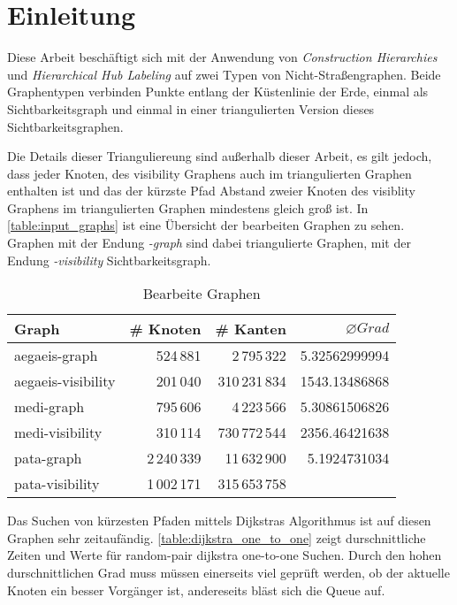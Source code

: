 \chapter{Einleitung}

Diese Arbeit beschäftigt sich mit der Anwendung von \emph{Construction Hierarchies} und \emph{Hierarchical Hub Labeling} auf zwei Typen von Nicht-Straßengraphen.
Beide Graphentypen verbinden Punkte entlang der Küstenlinie der Erde, einmal als Sichtbarkeitsgraph und einmal in einer triangulierten Version dieses Sichtbarkeitsgraphen.


Die Details dieser Trianguliereung sind außerhalb dieser Arbeit, es gilt jedoch, dass jeder Knoten, des visibility Graphens auch im triangulierten Graphen enthalten ist und das der kürzste Pfad Abstand zweier Knoten des visiblity Graphens im triangulierten Graphen mindestens gleich groß ist.
In \autoref{table:input_graphs} ist eine Übersicht der bearbeiten Graphen zu sehen. Graphen mit der Endung \emph{-graph} sind dabei triangulierte Graphen, mit der Endung \emph{-visibility} Sichtbarkeitsgraph.

\begin{table}[h]
    \centering
    \begin{tabular}{lrrr}
        \toprule
        Graph              & \# Knoten   & \# Kanten     & $\varnothing Grad$ \\ \midrule
        aegaeis-graph      & 524\,881    & 2\,795\,322   & 5.32562999994      \\
        aegaeis-visibility & 201\,040    & 310\,231\,834 & 1543.13486868      \\
        medi-graph         & 795\,606    & 4\,223\,566   & 5.30861506826      \\
        medi-visibility    & 310\,114    & 730\,772\,544 & 2356.46421638      \\
        pata-graph         & 2\,240\,339 & 11\,632\,900  & 5.1924731034       \\
        pata-visibility    & 1\,002\,171 & 315\,653\,758 &                    \\ \bottomrule
    \end{tabular}
    \caption{Bearbeite Graphen}
    \label{table:input_graphs}
\end{table}

Das Suchen von kürzesten Pfaden mittels Dijkstras Algorithmus ist auf diesen Graphen sehr zeitaufändig.
\autoref{table:dijkstra_one_to_one} zeigt durschnittliche Zeiten und Werte für random-pair dijkstra one-to-one Suchen.
Durch den hohen durschnittlichen Grad muss müssen einerseits viel geprüft werden, ob der aktuelle Knoten ein besser Vorgänger ist, andereseits bläst sich die Queue auf.

